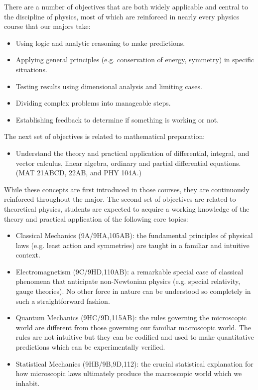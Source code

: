 \documentclass[12pt]{article}
\begin{document}
There are a number of objectives that are both widely applicable and
central to the discipline of physics, most of which are reinforced in
nearly every physics course that our majors take:
\begin{itemize}
 \item Using logic and analytic reasoning to make predictions.  
 \item Applying general principles (e.g. conservation of energy,
   symmetry) in specific situations.
 \item Testing results using dimensional analysis and limiting cases. 
 \item Dividing complex problems into manageable steps.
 \item Establishing feedback to determine if something is working or not.
\end{itemize}  
The next set of objectives is related to mathematical preparation:
\begin{itemize}
\item Understand the theory and practical application of differential,
  integral, and vector calculus, linear algebra, ordinary and partial
  differential equations.  (MAT 21ABCD, 22AB, and PHY 104A.)
\end{itemize}
While these concepts are first introduced in those courses, they are
continuously reinforced throughout the major.  The second set of
objectives are related to theoretical physics, students are expected
to acquire a working knowledge of the theory and practical application
of the following core topics:
\begin{itemize}
 \item Classical Mechanics (9A/9HA,105AB): the fundamental principles
   of physical laws (e.g. least action and symmetries) are taught in a
   familiar and intuitive context.
 \item Electromagnetism (9C/9HD,110AB): a remarkable special case of
   classical phenomena that anticipate non-Newtonian physics
   (e.g. special relativity, gauge theories).  No other force in
   nature can be understood so completely in such a straightforward
   fashion.  
 \item Quantum Mechanics (9HC/9D,115AB): the rules governing the
   microscopic world are different from those governing our familiar
   macroscopic world.  The rules are not intuitive but they can be
   codified and used to make quantitative predictions which can be
   experimentally verified.
 \item Statistical Mechanics (9HB/9B,9D,112): the crucial statistical
   explanation for how microscopic laws ultimately produce the
   macroscopic world which we inhabit.
\end{itemize}
\end{document}
